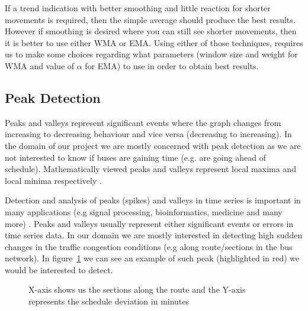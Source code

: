 If a trend indication with better smoothing and little reaction for shorter movements is required, then the simple average should produce the best results. However if smoothing is desired where you can still see shorter movements, then it is better to use either WMA or EMA. Using either of those techniques, requires us to make some choices regarding what parameters (window size and weight for WMA and value of $\alpha$ for EMA) to use in order to obtain best results.


\subsection{Peak Detection}
Peaks and valleys represent significant events where the graph changes from increasing to decreasing behaviour and vice versa (decreasing to increasing). In the domain of our project we are mostly concerned with peak detection as we are not interested to know if buses are gaining time (e.g. are going ahead of schedule). Mathematically viewed peaks and valleys represent local maxima and local minima respectively \cite{simon1994mathematics}.

Detection and analysis of peaks (spikes) and valleys in time series is important in many applications (e.g signal processing, bioinformatics, medicine and many more) \cite{ventzas2011peak}. Peaks and valleys usually represent either significant events or errors in time series data. In our domain we are mostly interested in detecting high sudden changes in the traffic congestion conditions (e.g along route/sections in the bus network). In figure~\ref{fig:peakExampleGraph} we can see an example of such peak (highlighted in red) we would be interested to detect.

\begin{figure}[ht]
	\caption{X-axis shows us the sections along the route and the Y-axis represents the schedule deviation in minutes}
	\label{fig:peakExampleGraph}
\end{figure}

